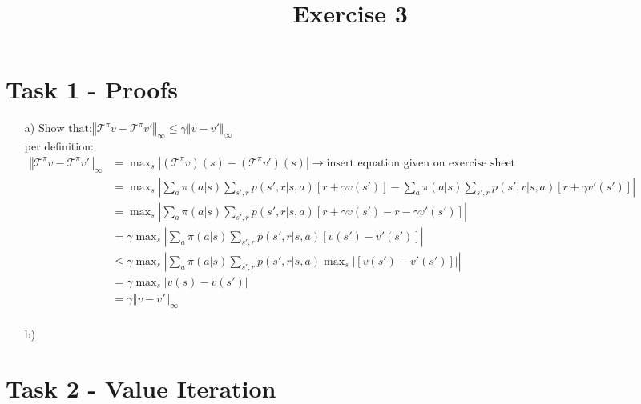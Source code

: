 \documentclass[a4paper]{article}
\date{}
\author{}
\title{\textbf{Exercise 3}}
\begin{document}
\maketitle 
\thispagestyle{fancy}

\section*{Task 1 - Proofs}

\begin{enumerate}
	\item[a)] $\text{Show that:} \left\Vert \mathcal{T}^\pi v - \mathcal{T}^\pi v' \right\Vert_\infty \leq \gamma \left \Vert v - v' \right \Vert_\infty$ \\ \linebreak
	per definition: \\
	$\begin{aligned}	
		\left\Vert \mathcal{T}^\pi v - \mathcal{T}^\pi v' \right\Vert_\infty  &= \max_s \left|(\mathcal{T}^\pi v )(s) -  (\mathcal{T}^\pi v' )(s) \right| \rightarrow \text{insert equation given on exercise sheet} \\
		&= \max_s \left| \sum_{a}\pi (a|s) \sum_{s',r}p(s',r |s,a)[r+\gamma v(s')] - \sum_{a}\pi (a|s) \sum_{s',r}p(s',r |s,a)[r+\gamma v'(s')] \right|  \\
		&= \max_s \left| \sum_{a}\pi (a|s) \sum_{s',r}p(s',r |s,a)[r+\gamma v(s') - r - \gamma v'(s')] \right| \\
		&= \gamma \max_s \left| \sum_{a}\pi (a|s) \sum_{s',r}p(s',r |s,a)[v(s') - v'(s')] \right| \\
		&\leq \gamma \max_s \left| \sum_{a}\pi (a|s) \sum_{s',r}p(s',r |s,a) \max_s \left| [v(s') - v'(s')] \right| \right| \\
		&= \gamma \max_s \left| v(s) - v(s') \right| \\
		&= \gamma \left \Vert v - v' \right \Vert_\infty \\
	\end{aligned}$
	
	\item[b)]
	
\end{enumerate}

\section*{Task 2 - Value Iteration}
\end{document}
